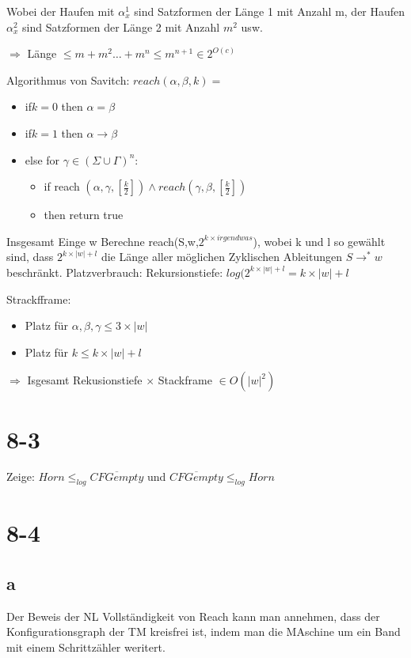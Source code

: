 \documentclass[12pt, oneside, a4paper, numbers=enddot, abstracton, parskip=full]{scrreprt}
\begin{document}
Wobei der Haufen mit $\alpha^1_x$ sind Satzformen der Länge 1 mit Anzahl m, der Haufen $\alpha^2_x$ sind Satzformen der Länge 2  mit Anzahl $m^2$ usw.

$\Rightarrow$ Länge $\leq m + m^2 \dots + m^n \leq m^{n+1} \in 2^{O(c)}$

Algorithmus von Savitch:
$reach(\alpha, \beta, k) = $
\begin{itemize}
\item if$k=0$ then $\alpha = \beta$
\item if$k=1$ then $\alpha \rightarrow \beta$
\item else for $\gamma \in (\Sigma \cup \Gamma)^n:$
  \begin{itemize}
  \item if reach $(\alpha, \gamma, [ \frac{k}{2} ] ) \wedge reach(\gamma, \beta, [ \frac{k}{2} ])$
  \item then return true
  \end{itemize}
\end{itemize}

  Insgesamt Einge w
  Berechne reach(S,w,$2^{k \times irgendwas}$), wobei k und l so gewählt sind, dass $2^{k \times |w| +l}$ die Länge aller möglichen Zyklischen Ableitungen $S\rightarrow^{*}w$ beschränkt.
  Platzverbrauch: Rekursionstiefe: $log(2^{k \times |w| +l} = k \times |w| +l$

  Strackfframe:
  \begin{itemize}
  \item Platz für $\alpha, \beta, \gamma \leq 3 \times |w|$
  \item Platz für $k \leq k \times |w| + l$

  \end{itemize}

  $\Rightarrow$ Isgesamt Rekusionstiefe $\times$ Stackframe $\in O(|w|^2)$

  \section{8-3}
  Zeige: $Horn \leq_{log} \overline{CFGempty}$ und $\overline{CFGempty}\leq_{log} Horn$
  
  \section{8-4}
  \subsection{a}
  Der Beweis der NL Vollständigkeit von Reach kann man annehmen, dass der Konfigurationsgraph der TM kreisfrei ist, indem man die MAschine um ein Band mit einem Schrittzähler weritert.
\end{document}
